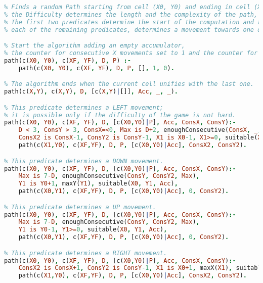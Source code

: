 \begin{lstlisting}[label=code:prolog-theory, language=Prolog, caption=Teoria TuProlog]
% path(c(+X0, +Y0), c(+XF, +YF), @Difficulty, -Path)
% Finds a random Path starting from cell (X0, Y0) and ending in cell (XF, YF);
% the Difficulty determines the length and the complexity of the path, that could have more straight road segments.
% The first two predicates determine the start of the computation and the finish;
% each of the remaining predicates, determines a movement towards one of the four directions.

% Start the algorithm adding an empty accumulator,
% the counter for consecutive X movements set to 1 and the counter for consecutive Y movements set to 0.
path(c(X0, Y0), c(XF, YF), D, P) :-
    path(c(X0, Y0), c(XF, YF), D, P, [], 1, 0).

% The algorithm ends when the current cell unifies with the last one.
path(c(X,Y), c(X,Y), D, [c(X,Y)|[]], Acc, _, _).

% This predicate determines a LEFT movement;
% it is possible only if the difficulty of the game is not hard.
path(c(X0, Y0), c(XF, YF), D, [c(X0,Y0)|P], Acc, ConsX, ConsY):-
    D < 3, ConsY > 3, ConsX=<0, Max is D+2, enoughConsecutive(ConsX, _, Max),
    ConsX2 is ConsX-1, ConsY2 is ConsY-1, X1 is X0-1, X1>=0, suitable(X1, Y0, Acc),
    path(c(X1,Y0), c(XF,YF), D, P, [c(X0,Y0)|Acc], ConsX2, ConsY2).

% This predicate determines a DOWN movement.
path(c(X0, Y0), c(XF, YF), D, [c(X0,Y0)|P], Acc, ConsX, ConsY):-
    Max is 7-D, enoughConsecutive(ConsY, ConsY2, Max),
    Y1 is Y0+1, maxY(Y1), suitable(X0, Y1, Acc),
    path(c(X0,Y1), c(XF,YF), D, P, [c(X0,Y0)|Acc], 0, ConsY2).

% This predicate determines a UP movement.
path(c(X0, Y0), c(XF, YF), D, [c(X0,Y0)|P], Acc, ConsX, ConsY):-
    Max is 7-D, enoughConsecutive(ConsY, ConsY2, Max),
    Y1 is Y0-1, Y1>=0, suitable(X0, Y1, Acc),
    path(c(X0,Y1), c(XF,YF), D, P, [c(X0,Y0)|Acc], 0, ConsY2).

% This predicate determines a RIGHT movement.
path(c(X0, Y0), c(XF, YF), D, [c(X0,Y0)|P], Acc, ConsX, ConsY):-
    ConsX2 is ConsX+1, ConsY2 is ConsY-1, X1 is X0+1, maxX(X1), suitable(X1, Y0, Acc),
    path(c(X1,Y0), c(XF,YF), D, P, [c(X0,Y0)|Acc], ConsX2, ConsY2).

\end{lstlisting}